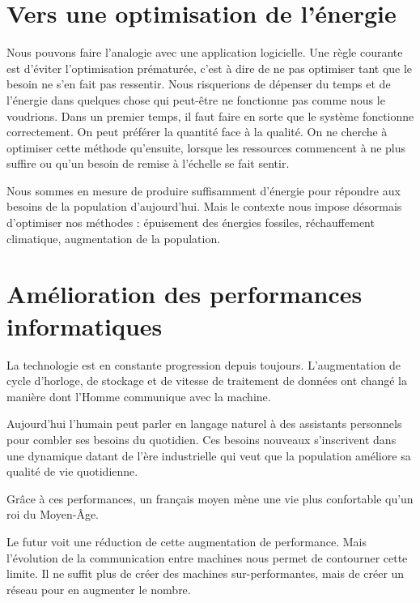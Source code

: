 \section{Vers une optimisation de l'énergie}

Nous pouvons faire l’analogie avec une application logicielle. Une règle courante est d’éviter
l’optimisation prématurée, c’est à dire de ne pas optimiser tant que le besoin ne s’en fait pas
ressentir. Nous risquerions de dépenser du temps et de l'énergie dans quelques chose qui
peut-être ne fonctionne pas comme nous le voudrions.
Dans un premier temps, il faut faire en sorte que le système fonctionne correctement.
On peut préférer la quantité face à la qualité. On ne cherche à optimiser cette méthode
qu’ensuite, lorsque les ressources commencent à ne plus suffire ou qu’un besoin de remise
à l’échelle se fait sentir.

Nous sommes en mesure de produire suffisamment d’énergie pour répondre aux
besoins de la population d'aujourd'hui. Mais le contexte nous impose désormais d’optimiser
nos méthodes : épuisement des énergies fossiles, réchauffement climatique, augmentation de la
population.

\section{Amélioration des performances informatiques}

La technologie est en constante progression depuis toujours.
L'augmentation de cycle d'horloge, de stockage et de vitesse de traitement de données
ont changé la manière dont l'Homme communique avec la machine.

Aujourd'hui l'humain peut parler en langage naturel à des assistants personnels pour combler ses
besoins du quotidien.
Ces besoins nouveaux s'inscrivent dans une dynamique datant de l'ère industrielle qui veut que
la population améliore sa qualité de vie quotidienne.

Grâce à ces performances, un français moyen mène une vie plus confortable qu'un roi du Moyen-Âge.

Le futur voit une réduction de cette augmentation de performance. Mais l'évolution de la communication entre machines
nous permet de contourner cette limite. Il ne suffit plus de créer des machines sur-performantes, mais de créer un
réseau pour en augmenter le nombre.





